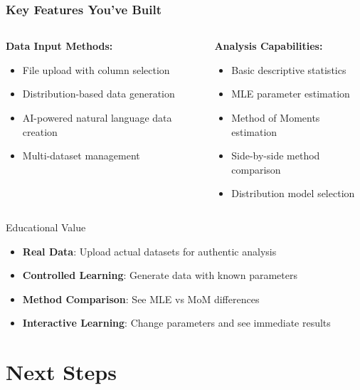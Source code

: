 \documentclass[aspectratio=169]{beamer}
\begin{document}
\begin{frame}
\frametitle{Key Features You've Built}
\begin{columns}
\begin{column}{0.5\textwidth}
\textbf{Data Input Methods:}
\begin{itemize}
\item File upload with column selection
\item Distribution-based data generation
\item AI-powered natural language data creation
\item Multi-dataset management
\end{itemize}
\end{column}
\begin{column}{0.5\textwidth}
\textbf{Analysis Capabilities:}
\begin{itemize}
\item Basic descriptive statistics
\item MLE parameter estimation
\item Method of Moments estimation
\item Side-by-side method comparison
\item Distribution model selection
\end{itemize}
\end{column}
\end{columns}

\begin{alertblock}{Educational Value}
\begin{itemize}
\item \textbf{Real Data}: Upload actual datasets for authentic analysis
\item \textbf{Controlled Learning}: Generate data with known parameters
\item \textbf{Method Comparison}: See MLE vs MoM differences
\item \textbf{Interactive Learning}: Change parameters and see immediate results
\end{itemize}
\end{alertblock}
\end{frame}

\section{Next Steps}
\end{document}
